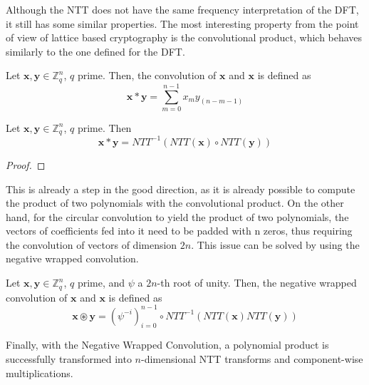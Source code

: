 Although the NTT does not have the same frequency interpretation of the DFT, it still has some similar properties. The most interesting property from the point of view of lattice based cryptography is the convolutional product, which behaves similarly to the one defined for the DFT.

\begin{definition}
Let $\mathbf{x},\mathbf{y}\in\mathbb{Z}_q^n$, $q$ prime. Then, the convolution of $\mathbf{x}$ and $\mathbf{x}$ is defined as
\begin{equation*}
\mathbf{x}\ast\mathbf{y} = \sum_{m=0}^{n-1}x_my_{(n-m-1)}
\end{equation*}
\end{definition}

\begin{theorem}
Let $\mathbf{x},\mathbf{y}\in\mathbb{Z}_q^n$, $q$ prime. Then
\begin{equation*}
\mathbf{x}\ast\mathbf{y} = NTT^{-1}(NTT(\mathbf{x}) \circ NTT(\mathbf{y}))
\end{equation*}
\end{theorem}
\begin{proof}

\end{proof}

This is already a step in the good direction, as it is already possible to compute the product of two polynomials with the convolutional product. On the other hand, for the circular convolution to yield the product of two polynomials, the vectors of coefficients fed into it need to be padded with n zeros, thus requiring the convolution of vectors of dimension $2n$. This issue can be solved by using the negative wrapped convolution.

\begin{definition}
Let $\mathbf{x},\mathbf{y}\in\mathbb{Z}_q^n$, $q$ prime, and $\psi$ a $2n$-th root of unity. Then, the negative wrapped convolution of $\mathbf{x}$ and $\mathbf{x}$ is defined as
\begin{equation*}
\mathbf{x}\circledast\mathbf{y} = (\psi^{-i})_{i=0}^{n-1}\circ NTT^{-1}(NTT(\mathbf{x})NTT(\mathbf{y}))
\end{equation*}
\end{definition}

Finally, with the Negative Wrapped Convolution, a polynomial product is successfully transformed into $n$-dimensional NTT transforms and component-wise multiplications.


